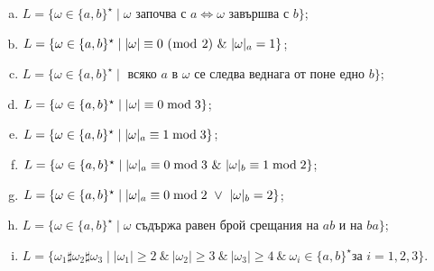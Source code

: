 \begin{extra}
\begin{problem}
\begin{enumerate}[a)]
  \item
    $L = \{\omega \in \{a,b\}^\star \mid \omega\text{ започва с }a \iff \omega\text{ завършва с }b\}$;
  \item
    $L = \{\omega \in \{a,b\}^\star \mid \vert{\omega}\vert \equiv 0\ (\bmod\ 2)\ \&\ \vert{\omega}\vert_{a} = 1\}$;
  \item
    $L = \{\omega \in \{a,b\}^\star \mid \text{ всяко }a\text{ в }\omega\text{ се следва веднага от поне едно }b\}$;
  \item
    $L = \{\omega \in \{a,b\}^\star \mid \vert{\omega}\vert \equiv 0 \bmod 3\}$;
  \item
    $L = \{\omega \in \{a,b\}^\star \mid \vert{\omega}\vert_{a} \equiv 1 \bmod 3\}$;
  \item
    $L = \{\omega \in \{a,b\}^\star \mid \vert{\omega}\vert_{a} \equiv 0 \bmod 3\ \&\ \vert{\omega}\vert_{b} \equiv 1 \bmod 2\}$;
  \item
    $L = \{\omega \in \{a,b\}^\star \mid \vert{\omega}\vert_{a} \equiv 0 \bmod 2\ \vee\ \vert{\omega}\vert_{b} = 2\}$;
  \item
    $L = \{\omega \in \{a,b\}^\star \mid \omega \text{ съдържа равен брой срещания на }ab\text{ и на }ba\}$;
  \item
    $L = \{\omega_1 \sharp \omega_2 \sharp \omega_3 \mid |\omega_1| \geq 2\ \&\ |\omega_2| \geq 3\ \&\ |\omega_3| \geq 4\ \&\ \omega_i \in \{a,b\}^\star\text{
      за }i = 1,2,3\}$.
  \end{enumerate}
\end{problem}
\end{extra}

